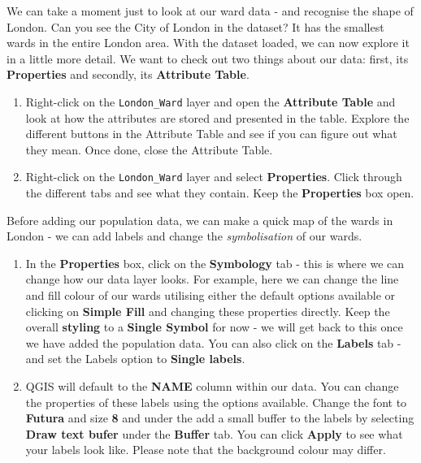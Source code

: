 \documentclass[
]{book}
\providecommand{\tightlist}{%
  \setlength{\itemsep}{0pt}\setlength{\parskip}{0pt}}
\begin{document}
We can take a moment just to look at our ward data - and recognise the shape of London. Can you see the City of London in the dataset? It has the smallest wards in the entire London area. With the dataset loaded, we can now explore it in a little more detail. We want to check out two things about our data: first, its \textbf{Properties} and secondly, its \textbf{Attribute Table}.

\begin{enumerate}
\def\labelenumi{\arabic{enumi}.}
\setcounter{enumi}{7}
\tightlist
\item
  Right-click on the \texttt{London\_Ward} layer and open the \textbf{Attribute Table} and look at how the attributes are stored and presented in the table. Explore the different buttons in the Attribute Table and see if you can figure out what they mean. Once done, close the Attribute Table.
\item
  Right-click on the \texttt{London\_Ward} layer and select \textbf{Properties}. Click through the different tabs and see what they contain. Keep the \textbf{Properties} box open.
\end{enumerate}

Before adding our population data, we can make a quick map of the wards in London - we can add labels and change the \emph{symbolisation} of our wards.

\begin{enumerate}
\def\labelenumi{\arabic{enumi}.}
\setcounter{enumi}{9}
\item
  In the \textbf{Properties} box, click on the \textbf{Symbology} tab - this is where we can change how our data layer looks. For example, here we can change the line and fill colour of our wards utilising either the default options available or clicking on \textbf{Simple Fill} and changing these properties directly. Keep the overall \textbf{styling} to a \textbf{Single Symbol} for now - we will get back to this once we have added the population data. You can also click on the \textbf{Labels} tab - and set the Labels option to \textbf{Single labels}.
\item
  QGIS will default to the \textbf{NAME} column within our data. You can change the properties of these labels using the options available. Change the font to \textbf{Futura} and size \textbf{8} and under the add a small buffer to the labels by selecting \textbf{Draw text bufer} under the \textbf{Buffer} tab. You can click \textbf{Apply} to see what your labels look like. Please note that the background colour may differ.
\end{enumerate}
\end{document}
